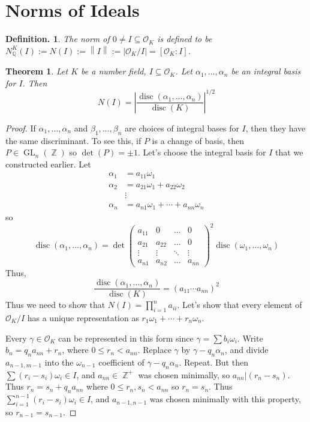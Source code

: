 \documentclass[11pt, a4paper]{memoir}
\DeclareMathOperator{\Q}{{\mathbb{Q}}}
\DeclareMathOperator{\Z}{{\mathbb{Z}}}
\newcommand{\norm}[1]{\ensuremath{\left\lVert#1\right\rVert}}
\theoremstyle{change}
\newtheorem{theorem}{Theorem}[section]
\theoremstyle{plain}
\theoremstyle{nonumberplain}
\newtheorem{definition}{Definition.}
\newtheorem{proof}{Proof}
\DeclareMathOperator{\disc}{disc}
\DeclareMathOperator{\GL}{GL}
\begin{document}
\section{Norms of Ideals}
\begin{definition}
    The norm of $0\neq I\subseteq\mathcal{O}_K$ is defined to be $N_{\Q}^K(I):=N(I):=\norm{I}:=|\mathcal{O}_K/I|=[\mathcal{O}_K:I]$.
\end{definition}
\begin{theorem}
    Let $K$ be a number field, $I\subseteq\mathcal{O}_K$.
    Let $\alpha_1,\ldots,\alpha_n$ be an integral basis for $I$.
    Then
    \begin{equation*}
        N(I)=\left\lvert\frac{\disc(\alpha_1,\ldots,\alpha_n)}{\disc(K)}\right\rvert^{1/2}
    \end{equation*}
\end{theorem}
\begin{proof}
    If $\alpha_1,\ldots,\alpha_n$ and $\beta_1,\ldots,\beta_n$ are choices of integral bases for $I$, then they have the same discriminant.
    To see this, if $P$ is a change of basis, then $P\in\GL_n(\Z)$ so $\det(P)=\pm 1$.
    Let's choose the integral basis for $I$ that we constructed earlier.
    Let
    \begin{align*}
        \alpha_1 &= a_{11}\omega_1\\
        \alpha_2 &= a_{21}\omega_1+a_{22}\omega_2\\
                 &\vdots\\
        \alpha_n &= a_{n1}\omega_1+\cdots+a_{nn}\omega_n
    \end{align*}
    so
    \begin{equation*}
        \disc(\alpha_1,\ldots,\alpha_n) = \det
        \begin{pmatrix}a_{11}&0&\hdots&0\\a_{21}&a_{22}&\hdots&0\\\vdots&\vdots&\ddots&\vdots\\a_{n1}&a_{n2}&\hdots&a_{nn}\end{pmatrix}^2\disc(\omega_1,\ldots,\omega_n)
    \end{equation*}
    Thus,
    \begin{equation*}
        \frac{\disc(\alpha_1,\ldots,\alpha_n)}{\disc(K)}=(a_{11}\cdots a_{nn})^2
    \end{equation*}
    Thus we need to show that $N(I)=\prod_{i=1}^n a_{ii}$.
    Let's show that every element of $\mathcal{O}_K/I$ has a unique representation as $r_1\omega_1+\cdots+r_n\omega_n$.

    Every $\gamma\in\mathcal{O}_K$ can be represented in this form since $\gamma=\sum b_i\omega_i$.
    Write $b_n=q_na_{nn}+r_n$, where $0\leq r_n<a_{nn}$.
    Replace $\gamma$ by $\gamma-q_n\alpha_n$, and divide $a_{n-1,m-1}$ into the $\omega_{n-1}$ coefficient of $\gamma-q_n\alpha_n$.
    Repeat.
    But then $\sum(r_i-s_i)\omega_i\in I$, and $a_{nn}\in\Z^+$ was chosen minimally, so $a_{nn}|(r_n-s_n)$.
    Thus $r_n=s_n+q_na_{nn}$ where $0\leq r_n,s_n<a_{nn}$ so $r_n=s_n$.
    Thus $\sum_{i=1}^{n-1}(r_i-s_i)\omega_i\in I$, and $a_{n-1,n-1}$ was chosen minimally with this property, so $r_{n-1}=s_{n-1}$.
\end{proof}
\end{document}
